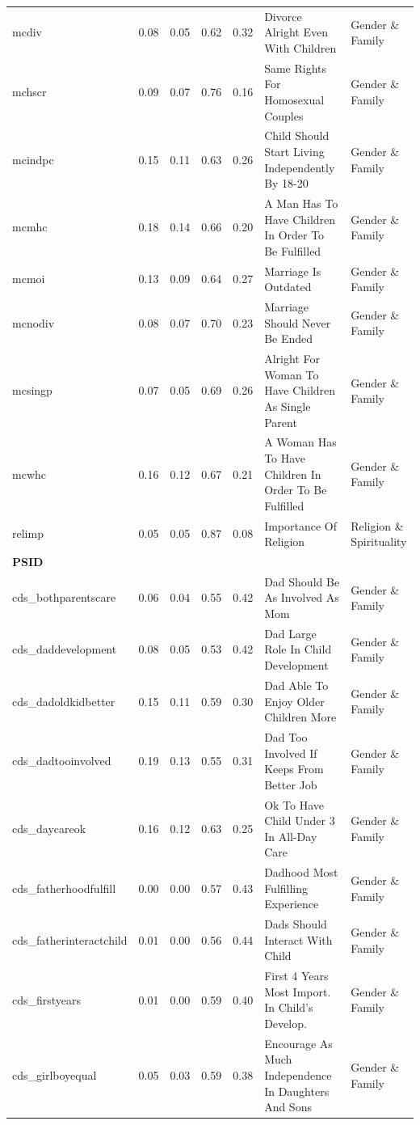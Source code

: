 \documentclass[
  12pt,
]{article}
\begin{document}
\begin{landscape}
\begin{scriptsize}
\begin{longtable}{|p{1.75in}|p{0.3in}|p{0.3in}|p{0.3in}|p{0.3in}|p{2.5in}|p{2.5in}}
mcdiv & 0.08 & 0.05 & 0.62 & 0.32 & Divorce Alright Even With Children & Gender \& Family \\ 
mchscr & 0.09 & 0.07 & 0.76 & 0.16 & Same Rights For Homosexual Couples & Gender \& Family \\ 
mcindpc & 0.15 & 0.11 & 0.63 & 0.26 & Child Should Start Living Independently By 18-20 & Gender \& Family \\ 
mcmhc & 0.18 & 0.14 & 0.66 & 0.20 & A Man Has To Have Children In Order To Be Fulfilled & Gender \& Family \\ 
mcmoi & 0.13 & 0.09 & 0.64 & 0.27 & Marriage Is Outdated & Gender \& Family \\ 
mcnodiv & 0.08 & 0.07 & 0.70 & 0.23 & Marriage Should Never Be Ended & Gender \& Family \\ 
mcsingp & 0.07 & 0.05 & 0.69 & 0.26 & Alright For Woman To Have Children As Single Parent & Gender \& Family \\ 
mcwhc & 0.16 & 0.12 & 0.67 & 0.21 & A Woman Has To Have Children In Order To Be Fulfilled & Gender \& Family \\ 
relimp & 0.05 & 0.05 & 0.87 & 0.08 & Importance Of Religion & Religion \& Spirituality \\ 
\midrule
\multicolumn{7}{l}{\textbf{PSID}} \\ 
\midrule
cds\_bothparentscare & 0.06 & 0.04 & 0.55 & 0.42 & Dad Should Be As Involved As Mom & Gender \& Family \\ 
cds\_daddevelopment & 0.08 & 0.05 & 0.53 & 0.42 & Dad Large Role In Child Development & Gender \& Family \\ 
cds\_dadoldkidbetter & 0.15 & 0.11 & 0.59 & 0.30 & Dad Able To Enjoy Older Children More & Gender \& Family \\ 
cds\_dadtooinvolved & 0.19 & 0.13 & 0.55 & 0.31 & Dad Too Involved If Keeps From Better Job & Gender \& Family \\ 
cds\_daycareok & 0.16 & 0.12 & 0.63 & 0.25 & Ok To Have Child Under 3 In All-Day Care & Gender \& Family \\ 
cds\_fatherhoodfulfill & 0.00 & 0.00 & 0.57 & 0.43 & Dadhood Most Fulfilling Experience & Gender \& Family \\ 
cds\_fatherinteractchild & 0.01 & 0.00 & 0.56 & 0.44 & Dads Should Interact With Child & Gender \& Family \\ 
cds\_firstyears & 0.01 & 0.00 & 0.59 & 0.40 & First 4 Years Most Import. In Child's Develop. & Gender \& Family \\ 
cds\_girlboyequal & 0.05 & 0.03 & 0.59 & 0.38 & Encourage As Much Independence In Daughters And Sons & Gender \& Family \\ 

\end{longtable}
\end{scriptsize}
\end{landscape}
\end{document}
